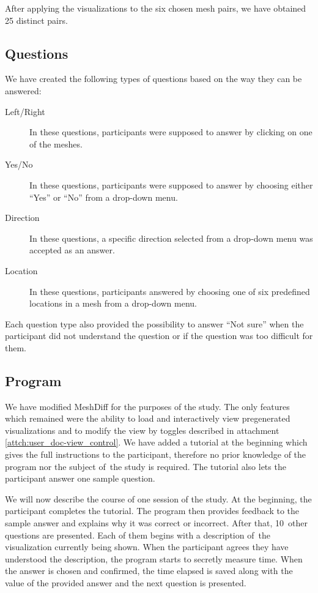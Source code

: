 After applying the visualizations to the six chosen mesh pairs, we have obtained 25 distinct pairs.

\subsection{Questions}
\label{subsec:user_study-setting-question}

We have created the following types of questions based on the way they can be answered:

\begin{description}
\item [Left/Right] In these questions, participants were supposed to answer by clicking on one of the meshes.
\item [Yes/No] In these questions, participants were supposed to answer by choosing either ``Yes'' or ``No'' from a drop-down menu.
\item [Direction] In these questions, a specific direction selected from a drop-down menu was accepted as an answer.
\item [Location] In these questions, participants answered by choosing one of six predefined locations in a mesh from a drop-down menu.
\end{description}

Each question type also provided the possibility to answer ``Not sure'' when the participant did not understand the question or if the question was too difficult for them.

\subsection{Program}
\label{subsec:user_study-setting-program}

We have modified MeshDiff for the purposes of the study. The only features which remained were the ability to load and interactively view pregenerated visualizations and to modify the view by toggles described in attachment \ref{attch:user_doc-view_control}. We have added a tutorial at the beginning which gives the full instructions to the participant, therefore no prior knowledge of the program nor the subject of~the study is required. The tutorial also lets the participant answer one sample question. 

We will now describe the course of one session of the study. At the beginning, the participant completes the tutorial. The program then provides feedback to the sample answer and explains why it was correct or incorrect. After that, 10~other questions are presented. Each of them begins with a description of~the visualization currently being shown. When the participant agrees they have understood the description, the program starts to secretly measure time. When the answer is chosen and confirmed, the time elapsed is saved along with the value of the provided answer and the next question is presented.

